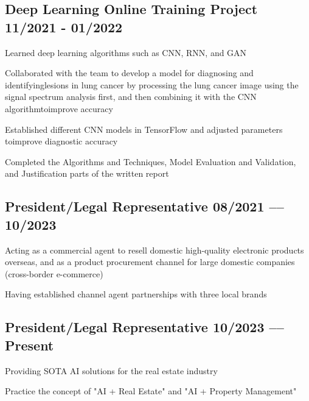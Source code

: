 \documentclass[letter,10pt]{article}
\begin{document}
\subsection{{Deep Learning Online Training Project \hfill 11/2021 - 01/2022}}
\begin{zitemize}
\item Learned deep learning algorithms such as CNN, RNN, and GAN
\item Collaborated with the team to develop a model for diagnosing and identifyinglesions in lung cancer by processing the lung cancer image using the signal spectrum analysis first, and then combining it with the CNN algorithmtoimprove accuracy
\item Established different CNN models in TensorFlow and adjusted parameters toimprove diagnostic accuracy
\item Completed the Algorithms and Techniques, Model Evaluation and Validation, and Justification parts of the written report
\end{zitemize}

\subsection{{President/Legal Representative \hfill 08/2021 –-- 10/2023}}
\begin{zitemize}
\item Acting as a commercial agent to resell domestic high-quality electronic products overseas, and as a product procurement channel for large domestic companies (cross-border e-commerce)
\item Having established channel agent partnerships with three local brands
\end{zitemize}

\subsection{{President/Legal Representative \hfill 10/2023 –-- Present}}
\begin{zitemize}
\item Providing SOTA AI solutions for the real estate industry
\item Practice the concept of "AI + Real Estate" and "AI + Property Management"
\end{zitemize}
\end{document}
